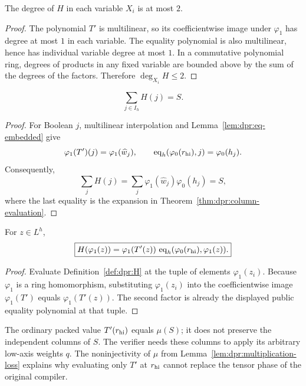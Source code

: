 \begin{lemma}\label{lem:dpr:H-degree}
The degree of $H$ in each variable $X_i$
is at most $2$.
\end{lemma}
\begin{proof}
The polynomial $T'$ is multilinear,
so its coefficientwise image under
$\varphi_1$ has degree at most $1$
in each variable. The equality
polynomial is also multilinear, hence
has individual variable degree at most
$1$. In a commutative polynomial ring,
degrees of products in any fixed variable
are bounded above by the sum of the
degrees of the factors. Therefore
$\deg_{X_i}H\leq2$.
\end{proof}

\begin{theorem}\label{thm:dpr:boolean-sum}
\[
 \boxed{
 \sum_{j\in I_h}H(j)=S.}
\]
\end{theorem}
\begin{proof}
For Boolean $j$, multilinear interpolation and
Lemma~\ref{lem:dpr:eq-embedded} give
\[
 \varphi_1(T')(j)=\varphi_1(\widehat w_j),
 \qquad
 \operatorname{eq}_h(\varphi_0(r_{\rm hi}),j)=\varphi_0(h_j).
\]
Consequently,
\[
 \sum_jH(j)
 =\sum_j\varphi_1(\widehat w_j)\varphi_0(h_j)=S,
\]
where the last equality is the expansion in
Theorem~\ref{thm:dpr:column-evaluation}.
\end{proof}

\begin{lemma}\label{lem:dpr:terminal}
For $z\in L^h$,
\[
 \boxed{
 H(\varphi_1(z))
 =\varphi_1(T'(z))\,
 \operatorname{eq}_h(\varphi_0(r_{\rm hi}),\varphi_1(z)).
 }
\]
\end{lemma}
\begin{proof}
Evaluate Definition~\ref{def:dpr:H}
at the tuple of elements $\varphi_1(z_i)$.
Because $\varphi_1$ is a ring homomorphism,
substituting $\varphi_1(z_i)$ into the
coefficientwise image $\varphi_1(T')$
equals $\varphi_1(T'(z))$. The second
factor is already the displayed public
equality polynomial at that tuple.
\end{proof}

\begin{remark}
The ordinary packed value $T'(r_{\rm hi})$
equals $\mu(S)$; it does not preserve
the independent columns of $S$.
The verifier needs these columns to
apply its arbitrary low-axis weights $q$.
The noninjectivity of $\mu$ from
Lemma~\ref{lem:dpr:multiplication-loss}
explains why evaluating only $T'$ at
$r_{\rm hi}$ cannot replace the tensor
phase of the original compiler.
\end{remark}
